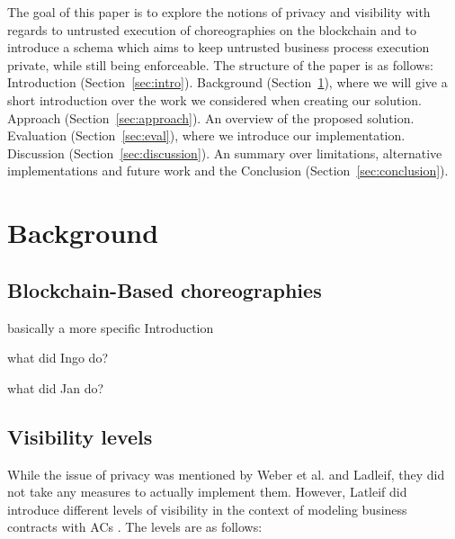 \documentclass[runningheads]{llncs}
\newcommand{\refsec}[1]{Section~\ref{#1}}
\begin{document}
The goal  of this paper is to explore the notions of privacy and visibility with regards to untrusted execution of choreographies on the blockchain and to introduce a schema which aims to keep untrusted business process execution  private, while still being enforceable. The structure of the paper is as follows: Introduction (\refsec{sec:intro}).  Background (\refsec{sec:background}), where we will give a short introduction over the work we considered when creating our solution. Approach (\refsec{sec:approach}). An overview of the proposed solution. Evaluation (\refsec{sec:eval}),  where we introduce our implementation. Discussion (\refsec{sec:discussion}). An summary over limitations, alternative implementations and future work and the Conclusion (\refsec{sec:conclusion}).







\section{Background} \label{sec:background}

\subsection{Blockchain-Based choreographies} \label{subsec:blockchainbased}

basically a more specific Introduction

what did Ingo do?

what did Jan do?




\subsection{Visibility levels} \label{subsec:levels}

While the issue of privacy was mentioned by Weber et al. and Ladleif, they did not take any measures to actually implement them. However, Latleif did introduce different levels of visibility in the context of modeling business contracts with ACs \cite{ladleif}. The levels are as follows:
\end{document}
